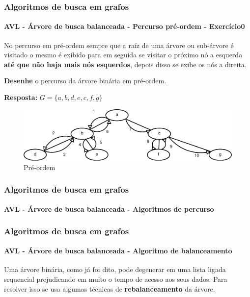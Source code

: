 \begin{frame}
	\frametitle{Algoritmos de busca em grafos}
	\framesubtitle{AVL - Árvore de busca balanceada - Percurso pré-ordem - Exercício0}
	
	\par No percurso em pré-ordem sempre que a raíz de uma árvore ou sub-árvore é visitado o mesmo é exibido para em seguida se visitar o próximo nó a esquerda \textbf{até que não haja mais nós esquerdos}, depois disso se exibe os nós a direita.

	\par \textbf{Desenhe} o percurso da árvore binária em pré-ordem.
	\pause
	\par \textbf{Resposta:} $G = \{a,b,d,e,c,f,g\}$
	\begin{figure}
		\centering
		\includegraphics[width=0.7\linewidth]{images/preordem}
		\caption{Pré-ordem}
		\label{fig:preordem}
	\end{figure}
\end{frame}


\begin{frame}
	\frametitle{Algoritmos de busca em grafos}
	\framesubtitle{AVL - Árvore de busca balanceada - Algoritmos de percurso}
	
	
\end{frame}


\begin{frame}
	\frametitle{Algoritmos de busca em grafos}
	\framesubtitle{AVL - Árvore de busca balanceada - Algoritmo de balanceamento}
	\par Uma árvore binária, como já foi dito, pode degenerar em uma lista ligada sequencial prejudicando em muito o tempo de acesso aos seus dados. Para resolver isso se usa algumas técnicas de \textbf{rebalanceamento} da árvore.
\end{frame}

